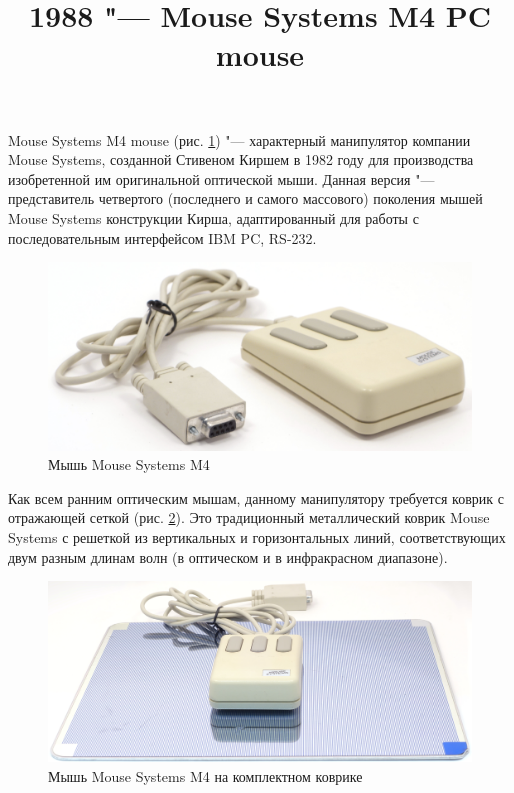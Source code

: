 \documentclass[11pt, a4paper]{article}
\begin{document}
\title{1988 "--- Mouse Systems M4 PC mouse}
\date{}
\maketitle
{}
Mouse Systems M4 mouse (рис. \ref{fig:mscM4Pic}) "--- характерный манипулятор компании Mouse Systems, созданной Стивеном Киршем в 1982 году для производства изобретенной им оригинальной оптической мыши. Данная версия "--- представитель четвертого (последнего и самого массового) поколения мышей Mouse Systems конструкции Кирша, адаптированный для работы с последовательным интерфейсом IBM PC, RS-232.

\begin{figure}[h]
    \centering
    \includegraphics[scale=0.5]{1988_mouse_systems_m4/pic_30.jpg}
    \caption{Мышь Mouse Systems M4}
    \label{fig:mscM4Pic}
\end{figure}

Как всем ранним оптическим мышам, данному манипулятору требуется коврик с отражающей сеткой (рис. \ref{fig:mscM4Pad}). Это традиционный металлический коврик Mouse Systems с решеткой из вертикальных и горизонтальных линий, соответствующих двум разным длинам волн (в оптическом и в инфракрасном диапазоне).

\begin{figure}[h]
    \centering
    \includegraphics[scale=0.4]{1988_mouse_systems_m4/pad_30.jpg}
    \caption{Мышь Mouse Systems M4 на комплектном коврике}
    \label{fig:mscM4Pad}
\end{figure}
\end{document}
